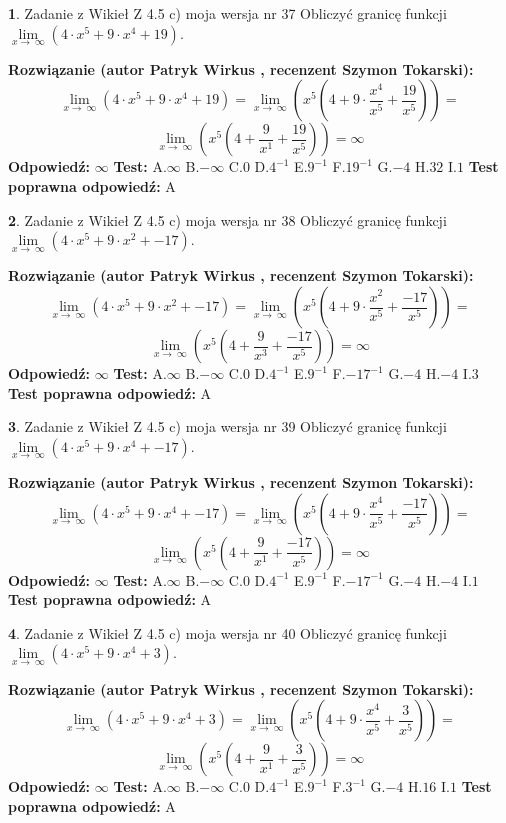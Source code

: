 \documentclass[12pt, a4paper]{article}
\theoremstyle{definition} %
\newtheorem{zad}{}
\newcommand{\zadStart}[1]{\begin{zad}#1\newline}
\newcommand{\zadStop}{\end{zad}}
\newcommand{\rozwStart}[2]{\noindent \textbf{Rozwiązanie (autor #1 , recenzent #2): }\newline}
\newcommand{\rozwStop}{\newline}
\newcommand{\odpStart}{\noindent \textbf{Odpowiedź:}\newline}
\newcommand{\odpStop}{\newline}
\newcommand{\testStart}{\noindent \textbf{Test:}\newline}
\newcommand{\testStop}{\newline}
\newcommand{\kluczStart}{\noindent \textbf{Test poprawna odpowiedź:}\newline}
\newcommand{\kluczStop}{\newline}
\begin{document}
\zadStart{Zadanie z Wikieł Z 4.5 c) moja wersja nr 37}
Obliczyć granicę funkcji  $\lim\limits_{x\to\ \infty}(4 \cdot x^{5}+9 \cdot x^{4}+19)$.
\zadStop
\rozwStart{Patryk Wirkus}{Szymon Tokarski}
$$\lim\limits_{x\to\ \infty}(4 \cdot x^{5}+9 \cdot x^{4}+19) = \lim\limits_{x\to\ \infty}(x^{5}(4 +9 \cdot \frac{x^{4}}{x^{5}}+\frac{19}{x^{5}})) =$$ $$\lim\limits_{x\to\ \infty}(x^{5}(4 +\frac{9}{x^{1}}+\frac{19}{x^{5}})) =\infty$$
\rozwStop
\odpStart
$\infty$
\odpStop
\testStart
A.$\infty$ B.$-\infty$ C.$0$ D.$4^{-1}$ E.$9^{-1}$
F.$19^{-1}$ G.$-4$
H.$32$
I.$1$
\testStop
\kluczStart
A
\kluczStop



\zadStart{Zadanie z Wikieł Z 4.5 c) moja wersja nr 38}
Obliczyć granicę funkcji  $\lim\limits_{x\to\ \infty}(4 \cdot x^{5}+9 \cdot x^{2}+-17)$.
\zadStop
\rozwStart{Patryk Wirkus}{Szymon Tokarski}
$$\lim\limits_{x\to\ \infty}(4 \cdot x^{5}+9 \cdot x^{2}+-17) = \lim\limits_{x\to\ \infty}(x^{5}(4 +9 \cdot \frac{x^{2}}{x^{5}}+\frac{-17}{x^{5}})) =$$ $$\lim\limits_{x\to\ \infty}(x^{5}(4 +\frac{9}{x^{3}}+\frac{-17}{x^{5}})) =\infty$$
\rozwStop
\odpStart
$\infty$
\odpStop
\testStart
A.$\infty$ B.$-\infty$ C.$0$ D.$4^{-1}$ E.$9^{-1}$
F.$-17^{-1}$ G.$-4$
H.$-4$
I.$3$
\testStop
\kluczStart
A
\kluczStop



\zadStart{Zadanie z Wikieł Z 4.5 c) moja wersja nr 39}
Obliczyć granicę funkcji  $\lim\limits_{x\to\ \infty}(4 \cdot x^{5}+9 \cdot x^{4}+-17)$.
\zadStop
\rozwStart{Patryk Wirkus}{Szymon Tokarski}
$$\lim\limits_{x\to\ \infty}(4 \cdot x^{5}+9 \cdot x^{4}+-17) = \lim\limits_{x\to\ \infty}(x^{5}(4 +9 \cdot \frac{x^{4}}{x^{5}}+\frac{-17}{x^{5}})) =$$ $$\lim\limits_{x\to\ \infty}(x^{5}(4 +\frac{9}{x^{1}}+\frac{-17}{x^{5}})) =\infty$$
\rozwStop
\odpStart
$\infty$
\odpStop
\testStart
A.$\infty$ B.$-\infty$ C.$0$ D.$4^{-1}$ E.$9^{-1}$
F.$-17^{-1}$ G.$-4$
H.$-4$
I.$1$
\testStop
\kluczStart
A
\kluczStop



\zadStart{Zadanie z Wikieł Z 4.5 c) moja wersja nr 40}
Obliczyć granicę funkcji  $\lim\limits_{x\to\ \infty}(4 \cdot x^{5}+9 \cdot x^{4}+3)$.
\zadStop
\rozwStart{Patryk Wirkus}{Szymon Tokarski}
$$\lim\limits_{x\to\ \infty}(4 \cdot x^{5}+9 \cdot x^{4}+3) = \lim\limits_{x\to\ \infty}(x^{5}(4 +9 \cdot \frac{x^{4}}{x^{5}}+\frac{3}{x^{5}})) =$$ $$\lim\limits_{x\to\ \infty}(x^{5}(4 +\frac{9}{x^{1}}+\frac{3}{x^{5}})) =\infty$$
\rozwStop
\odpStart
$\infty$
\odpStop
\testStart
A.$\infty$ B.$-\infty$ C.$0$ D.$4^{-1}$ E.$9^{-1}$
F.$3^{-1}$ G.$-4$
H.$16$
I.$1$
\testStop
\kluczStart
A
\kluczStop
\end{document}
